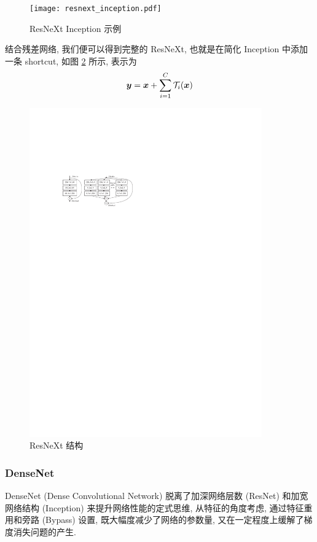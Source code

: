 \documentclass[12pt]{article}
\begin{document}
\begin{figure}[htbp]
  \centering
  \texttt{[image: resnext\_inception.pdf]}
  \caption{ResNeXt Inception 示例}
  \label{fig:resnext_inception}
\end{figure}

结合残差网络, 我们便可以得到完整的 ResNeXt, 也就是在简化 Inception 中添加一条 shortcut, 如图 \ref{fig:resnext_residual} 所示, 表示为
\begin{equation}
  \bm{y}=\bm{x}+\sum_{i=1}^C\mathcal{T}_i(\bm{x})
\end{equation}

\begin{figure}[htbp]
  \centering
  \includegraphics[width=10cm]{resnext_residual.pdf}
  \caption{ResNeXt 结构}
  \label{fig:resnext_residual}
\end{figure}

\subsubsection{DenseNet}


DenseNet (Dense Convolutional Network) \cite{Huang2017Densely} 脱离了加深网络层数 (ResNet) 和加宽网络结构 (Inception) 来提升网络性能的定式思维, 从特征的角度考虑, 通过特征重用和旁路 (Bypass) 设置, 既大幅度减少了网络的参数量, 又在一定程度上缓解了梯度消失问题的产生.
\end{document}
